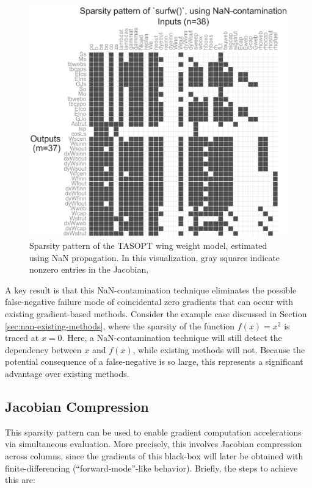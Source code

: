 \begin{figure}[H]
    \centering
    \includegraphics[width=6in]{../figures/nan-propagation/image2-crop.png}
    \caption{Sparsity pattern of the TASOPT wing weight model, estimated using NaN propagation. In this visualization, gray squares indicate nonzero entries in the Jacobian, }
    \label{fig:nan-jacobian}
\end{figure}

A key result is that this NaN-contamination technique eliminates the possible false-negative failure mode of coincidental zero gradients that can occur with existing gradient-based methods. Consider the example case discussed in Section \ref{sec:nan-existing-methods}, where the sparsity of the function $f(x) = x^2$ is traced at $x=0$. Here, a NaN-contamination technique will still detect the dependency between $x$ and $f(x)$, while existing methods will not. Because the potential consequence of a false-negative is so large, this represents a significant advantage over existing methods.

\subsection{Jacobian Compression}

This sparsity pattern can be used to enable gradient computation accelerations via simultaneous evaluation. More precisely, this involves Jacobian compression across columns, since the gradients of this black-box will later be obtained with finite-differencing (``forward-mode''-like behavior). Briefly, the steps to achieve this are:

